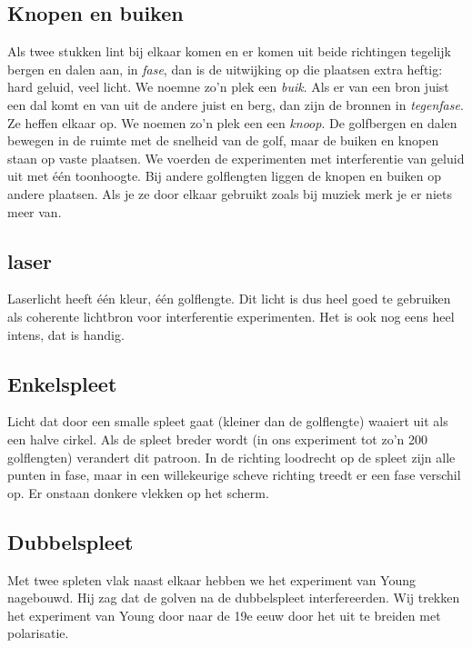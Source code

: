 \documentclass[../../main.tex]{subfiles}
\begin{document}
\subsection*{Knopen en buiken}
Als twee stukken lint bij elkaar komen en er komen uit beide richtingen tegelijk bergen en dalen aan, in \textit{fase}, dan is de uitwijking op die plaatsen extra heftig: hard geluid, veel licht. We noemne zo'n plek een \textit{buik}. Als er van een bron juist een dal komt en van uit de andere juist en berg, dan zijn de bronnen in \textit{tegenfase}.  Ze heffen elkaar op. We noemen zo'n plek een een \textit{knoop}.
De golfbergen en dalen bewegen in de ruimte met de snelheid van de golf, maar de buiken en knopen staan op vaste plaatsen.
We voerden de experimenten met interferentie van geluid uit met \'e\'en toonhoogte. Bij andere golflengten liggen de knopen en buiken op andere plaatsen. Als je ze door elkaar gebruikt zoals bij muziek merk je er niets meer van.

\subsection*{\easy laser}
Laserlicht heeft \'e\'en kleur, \'e\'en golflengte. Dit licht is dus heel goed te gebruiken als coherente lichtbron voor interferentie experimenten. Het is ook nog eens heel intens, dat is handig.
 
\subsection*{Enkelspleet}
Licht dat door een smalle spleet gaat (kleiner dan de golflengte) waaiert uit als een halve cirkel. Als de spleet breder wordt (in ons experiment tot zo'n 200 golflengten) verandert dit patroon. In de richting loodrecht op de spleet zijn alle punten in fase, maar in een willekeurige scheve richting treedt  er een fase verschil op. Er onstaan donkere vlekken op het scherm.

\subsection*{Dubbelspleet}
Met twee spleten vlak naast elkaar hebben we het experiment van Young nagebouwd. Hij zag dat de golven na de dubbelspleet interfereerden. Wij trekken het experiment van Young door naar de 19e eeuw door het uit te breiden met polarisatie.
\end{document}
